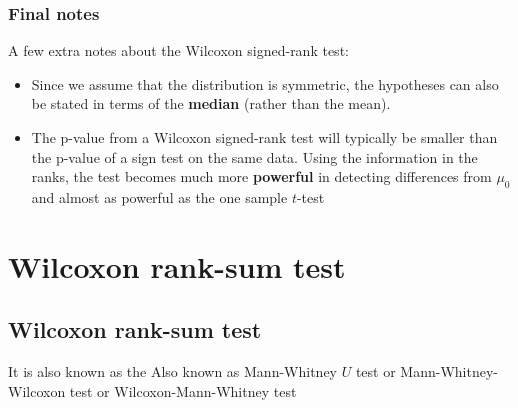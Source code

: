 \documentclass[a4paper]{article}
\begin{document}
\subsubsection{Final notes}
A few extra notes about the Wilcoxon signed-rank test:
\begin{itemize}
	\item Since we assume that the distribution is symmetric, the hypotheses can also be stated in terms of the \textcolor{myred}{\textbf{median}} (rather than the mean).
	\item The p-value from a Wilcoxon signed-rank test will typically be smaller than the p-value of a sign test on the same data. Using the information in the ranks, the test becomes much more \textcolor{mygreen}{\textbf{powerful}} in detecting differences from \( \mu_0 \) and almost as powerful as the one sample \( t \)-test
\end{itemize}
\section{Wilcoxon rank-sum test}\label{sec:15}
\subsection{Wilcoxon rank-sum test}
It is also known as the Also known as Mann-Whitney \( U \) test or Mann-Whitney-Wilcoxon test or Wilcoxon-Mann-Whitney test
\end{document}
